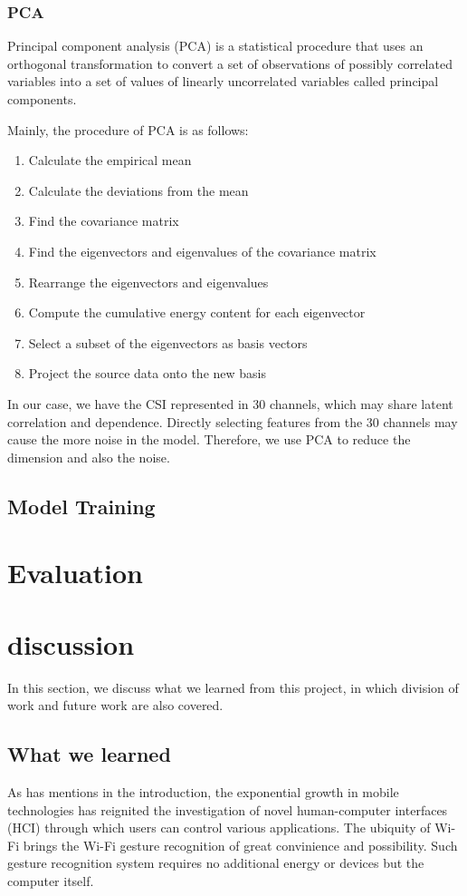 \documentclass[conference]{IEEEtran}
\begin{document}
\subsubsection{PCA}
Principal component analysis (PCA) is a statistical procedure that uses an orthogonal transformation to convert a set of observations of possibly correlated variables into a set of values of linearly uncorrelated variables called principal components. 

Mainly, the procedure of PCA is as follows:
\begin{enumerate}
	\item Calculate the empirical mean
	\item Calculate the deviations from the mean
	\item Find the covariance matrix
	\item Find the eigenvectors and eigenvalues of the covariance matrix
	\item Rearrange the eigenvectors and eigenvalues
	\item Compute the cumulative energy content for each eigenvector
	\item Select a subset of the eigenvectors as basis vectors
	\item Project the source data onto the new basis
\end{enumerate}

In our case, we have the CSI represented in 30 channels, which may share latent correlation and dependence. Directly selecting features from the 30 channels may cause the more noise in the model. Therefore, we use PCA to reduce the dimension and also the noise.
\subsection{Model Training}


\section{Evaluation} \label{section-evaluation}


\section{discussion} \label{section-discussion}

In this section, we discuss what we learned from this project, in which division of work and future work are also covered.

\subsection{What we learned}
As has mentions in the introduction, the exponential growth in mobile technologies has reignited the investigation of novel human-computer interfaces (HCI) through which users can control various applications. The ubiquity of Wi-Fi brings the Wi-Fi gesture recognition of great convinience and possibility. Such gesture recognition system requires no additional energy or devices but the computer itself.
\end{document}
